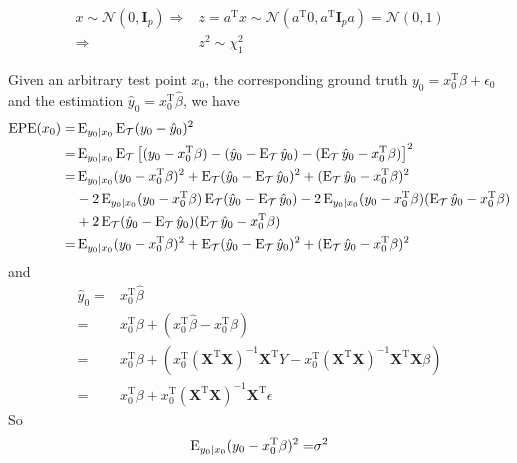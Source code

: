 \begin{sol}
\begin{align*}
x\sim\mathcal{N}(0,\mathbf{I}_p)\Longrightarrow & z=a^\mathrm{T}x\sim\mathcal{N}(a^\mathrm{T}0,a^\mathrm{T}\mathbf{I}_pa)=\mathcal{N}(0,1)\\
\Longrightarrow & z^2\sim \chi_1^2
\end{align*}
\end{sol}

\begin{sol}
Given an arbitrary test point $x_0$, the corresponding ground truth $y_0=x_0^\mathrm{T}\beta+\epsilon_0$ and the estimation $\hat{y}_0=x_0^\mathrm{T}\hat{\beta}$, we have
\begin{align*}
\mathrm{EPE}(x_0) = & \operatorname{E}_{y_0\vert x_0}\operatorname{E}_{\mathcal{T}}(y_0-\hat{y}_0)^2\\
=& \operatorname{E}_{y_0\vert x_0}\operatorname{E}_{\mathcal{T}}\left[(y_0-x_0^\mathrm{T}\beta)-(\hat{y}_0-\operatorname{E}_\mathcal{T}\hat{y}_0)-(\operatorname{E}_\mathcal{T}\hat{y}_0-x_0^\mathrm{T}\beta)\right]^2 \\
=& \operatorname{E}_{y_0\vert x_0}(y_0-x_0^\mathrm{T}\beta)^2+\operatorname{E}_{\mathcal{T}}(\hat{y}_0-\operatorname{E}_\mathcal{T}\hat{y}_0)^2+(\operatorname{E}_\mathcal{T}\hat{y}_0-x_0^\mathrm{T}\beta)^2 \\
& -2 \operatorname{E}_{y_0\vert x_0}(y_0-x_0^\mathrm{T}\beta) \operatorname{E}_{\mathcal{T}}(\hat{y}_0-\operatorname{E}_\mathcal{T}\hat{y}_0) -2 \operatorname{E}_{y_0\vert x_0}(y_0-x_0^\mathrm{T}\beta) (\operatorname{E}_\mathcal{T}\hat{y}_0-x_0^\mathrm{T}\beta) \\
& +2 \operatorname{E}_{\mathcal{T}}(\hat{y}_0-\operatorname{E}_\mathcal{T}\hat{y}_0)(\operatorname{E}_\mathcal{T}\hat{y}_0-x_0^\mathrm{T}\beta) \\
=& \operatorname{E}_{y_0\vert x_0}(y_0-x_0^\mathrm{T}\beta)^2+\operatorname{E}_{\mathcal{T}}(\hat{y}_0-\operatorname{E}_\mathcal{T}\hat{y}_0)^2+(\operatorname{E}_\mathcal{T}\hat{y}_0-x_0^\mathrm{T}\beta)^2
\end{align*}
and
\begin{align*}
\hat{y}_0 =& x_0^\mathrm{T}\hat{\beta}\\
=& x_0^\mathrm{T}\beta + (x_0^\mathrm{T}\hat{\beta}-x_0^\mathrm{T}\beta)\\
=& x_0^\mathrm{T}\beta + \left(x_0^\mathrm{T}(\mathbf{X}^\mathrm{T}\mathbf{X})^{-1}\mathbf{X}^\mathrm{T}Y-x_0^\mathrm{T}(\mathbf{X}^\mathrm{T}\mathbf{X})^{-1}\mathbf{X}^\mathrm{T}\mathbf{X}\beta\right) \\
=& x_0^\mathrm{T}\beta + x_0^\mathrm{T}(\mathbf{X}^\mathrm{T}\mathbf{X})^{-1}\mathbf{X}^\mathrm{T}\epsilon
\end{align*}
So
\begin{align*}
\E_{y_0\vert x_0}(y_0-x_0^\mathrm{T}\beta)^2 =& \sigma^2 \\

\end{align*}
\end{sol}
